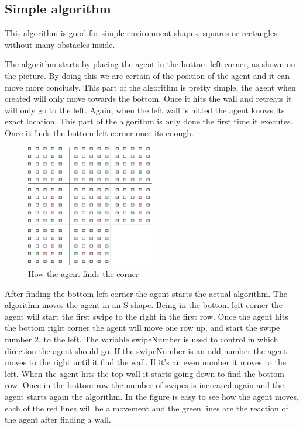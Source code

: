 \subsection{Simple algorithm}
	This algorithm is good for simple environment shapes, squares or rectangles without many obstacles inside.
	
	The algorithm starts by placing the agent in the bottom left corner, as shown on the picture. 
	By doing this we are certain of the position of the agent and it can move more conciusly.
	This part of the algorithm is pretty simple, the agent when created will only move towards the bottom.
	Once it hits the wall and retreats it will only go to the left.
	Again, when the left wall is hitted the agent knows its exact location.
	This part of the algorithm is only done the first time it executes.
	Once it finds the bottom left corner once its enough.

\begin{figure}[h] \label{fig:corner}	\centering
\includegraphics[width=0.5\textwidth]{find_corner}
\caption{How the agent finds the corner}
\end{figure}

After finding the bottom left corner the agent starts the actual algorithm. The
algorithm moves the agent in an S shape. Being in the bottom left corner the
agent will start the first swipe to the right in the first row.	Once the agent
hits the bottom right corner the agent will move one row up, and start the swipe
number 2, to the left.	The variable swipeNumber is used to control in which
direction the agent should go.	If the swipeNumber is an odd number the agent
moves to the right until it find the wall. If it's an even number it moves to
the left.	When the agent hits the top wall it starts going down to find the
bottom row.	Once in the bottom row the number of swipes is increased again and
the agent starts again the algorithm.	In the figure is easy to see how the agent
moves, each of the red lines will be a movement and the green lines are the
reaction of the agent after finding a wall.


